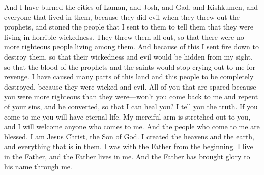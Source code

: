 And I have burned the cities of Laman, and Josh, and Gad, and Kishkumen, and everyone that lived in them, because they did evil when they threw out the prophets, and stoned the people that I sent to them to tell them that they were living in horrible wickedness.
\bverse \iffalse And because they did cast them all out, that there were none righteous among them, I did send down fire and destroy them, that their wickedness and abominations might be hid from before my face, that the blood of the prophets and the saints whom I sent among them might not cry unto me from the ground against them. \fi
They threw them all out, so that there were no more righteous people living among them. And because of this I sent fire down to destroy them, so that their wickedness and evil would be hidden from my sight, so that the blood of the prophets and the saints would stop crying out to me for revenge.
\bverse \iffalse And many great destructions have I caused to come upon this land, and upon this people, because of their wickedness and their abominations. \fi
I have caused many parts of this land and this people to be completely destroyed, because they were wicked and evil.
\bverse \iffalse O all ye that are spared because ye were more righteous than they, will ye not now return unto me, and repent of your sins, and be converted, that I may heal you? \fi
All of you that are spared because you were more righteous than they were---won't you come back to me and repent of your sins, and be converted, so that I can heal you?
\bverse \iffalse Yea, verily I say unto you, if ye will come unto me ye shall have eternal life. Behold, mine arm of mercy is extended towards you, and whosoever will come, him will I receive; and blessed are those who come unto me. \fi
I tell you the truth. If you come to me you will have eternal life. My merciful arm is stretched out to you, and I will welcome anyone who comes to me. And the people who come to me are blessed.
\bverse \iffalse Behold, I am Jesus Christ the Son of God. I created the heavens and the earth, and all things that in them are. I was with the Father from the beginning. I am in the Father, and the Father in me; and in me hath the Father glorified his name. \fi
I am Jesus Christ, the Son of God. I created the heavens and the earth, and everything that is in them. I was with the Father from the beginning. I live in the Father, and the Father lives in me. And the Father has brought glory to his name through me.
\bverse \iffalse I came unto my own, and my own received me not. And the scriptures concerning my coming are fulfilled. \fi
